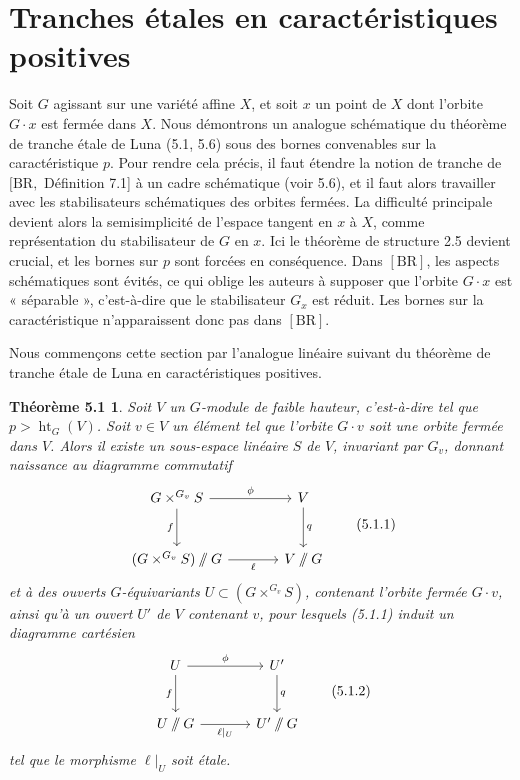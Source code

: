 \documentclass[11pt]{article}
\newcommand{\htG}{\operatorname{ht}_G}
\providecommand{\sslash}{\mathbin{/\mkern-6mu/}}
\newtheorem*{theoreme51}{Théorème 5.1}
\begin{document}
\section{Tranches étales en caractéristiques positives}

Soit \(G\) agissant sur une variété affine \(X\), et soit \(x\) un point de \(X\) dont
l'orbite \(G\cdot x\) est fermée dans \(X\). Nous démontrons un analogue schématique du
théorème de tranche étale de Luna (5.1, 5.6) sous des bornes convenables sur la
caractéristique \(p\). Pour rendre cela précis, il faut étendre la notion de tranche de
\([\mathrm{BR},\) Définition 7.1] à un cadre schématique (voir 5.6), et il faut alors
travailler avec les stabilisateurs schématiques des orbites fermées. La difficulté
principale devient alors la semisimplicité de l'espace tangent en \(x\) à \(X\), comme
représentation du stabilisateur de \(G\) en \(x\). Ici le théorème de structure 2.5 devient
crucial, et les bornes sur \(p\) sont forcées en conséquence. Dans \([\mathrm{BR}]\), les
aspects schématiques sont évités, ce qui oblige les auteurs à supposer que l'orbite
\(G\cdot x\) est « séparable », c'est-à-dire que le stabilisateur \(G_x\) est réduit. Les
bornes sur la caractéristique n'apparaissent donc pas dans \([\mathrm{BR}]\).

Nous commençons cette section par l'analogue linéaire suivant du théorème de tranche
étale de Luna en caractéristiques positives.

\begin{theoreme51}
Soit \(V\) un \(G\)-module de faible hauteur, c'est-à-dire tel que \(p>\htG(V)\). Soit
\(v\in V\) un élément tel que l'orbite \(G\cdot v\) soit une orbite fermée dans \(V\). Alors
il existe un sous-espace linéaire \(S\) de \(V\), invariant par \(G_v\), donnant naissance
au diagramme commutatif
\begin{equation}
\begin{tikzcd}[column sep=large,row sep=large]
  G\times^{G_v}S \arrow[r,"\phi"] \arrow[d,"f"'] & V \arrow[d,"q"] \\
  (G\times^{G_v}S)\sslash G \arrow[r,"\ell"'] & V\sslash G
\end{tikzcd}
\tag{5.1.1}
\end{equation}
et à des ouverts \(G\)-équivariants \(U\subset (G\times^{G_v}S)\), contenant l'orbite
fermée \(G\cdot v\), ainsi qu'à un ouvert \(U'\) de \(V\) contenant \(v\), pour lesquels
(5.1.1) induit un diagramme cartésien
\begin{equation}
\begin{tikzcd}[column sep=large,row sep=large]
  U \arrow[r,"\phi"] \arrow[d,"f"'] & U' \arrow[d,"q"] \\
  U\sslash G \arrow[r,"\ell|_{U}"'] & U'\sslash G
\end{tikzcd}
\tag{5.1.2}
\end{equation}
tel que le morphisme \(\ell|_U\) soit étale.
\end{theoreme51}
\end{document}
